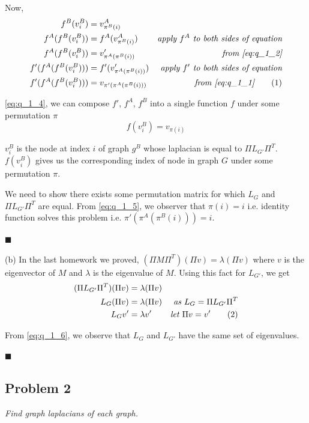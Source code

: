 \documentclass[12pt,a4paper]{article}
\newcommand\numberthis{\addtocounter{equation}{1}\tag{\theequation}}
\newcommand{\rightqed}{
\begin{flushright}
$\blacksquare$
\end{flushright}
}
\begin{document}
Now,
\begin{align*}
    f^B(v_i^B) &= v_{\pi^B(i)}^A &\\
    f^A(f^B(v_i^B)) &= f^A(v_{\pi^B(i)}^A) &\textit{apply $f^A$ to both sides of equation}\\
    f^A(f^B(v_i^B)) &= v'_{\pi^A(\pi^B(i))} &\textit{from \eqref{eq:q_1_2}} \\
    f'(f^A(f^B(v_i^B))) &= f'(v'_{\pi^A(\pi^B(i))}) &\textit{apply $f'$ to both sides of equation}\\
    f'(f^A(f^B(v_i^B))) &= v_{\pi'(\pi^A(\pi^B(i)))} &\textit{from \eqref{eq:q_1_1}} \numberthis \label{eq:q_1_4}
\end{align*}

\eqref{eq:q_1_4}, we can compose $f'$, $f^A$, $f^B$ into a single function $f$ under some permutation $\pi$
\begin{equation}
    f(v_i^B) = v_{\pi(i)} \label{eq:q_1_5}
\end{equation}

$v_i^B$ is the node at index $i$ of graph $g^B$ whose laplacian is equal to $\Pi L_{G'}\Pi^T$. $f(v_i^B)$ gives us the corresponding index of node in graph $G$ under some permutation $\pi$.

We need to show there exists some permutation matrix for which $L_G$ and $\Pi L_{G'}\Pi^T$ are equal. From \eqref{eq:q_1_5}, we observer that $\pi(i) = i$ i.e. identity function solves this problem i.e. $\pi'(\pi^A(\pi^B(i))) = i$.
\rightqed

(b) In the last homework we proved, $(\Pi M\Pi^T)(\Pi v) = \lambda(\Pi v)$ where $v$ is the eigenvector of $M$ and $\lambda$ is the eigenvalue of $M$. Using this fact for $L_{G'}$, we get
\begin{align*}
    (\Pi L_{G'}\Pi^T)(\Pi v) &= \lambda(\Pi v) &\\
    L_G(\Pi v) &= \lambda(\Pi v) &\textit{as $L_G = \Pi L_{G'}\Pi^T$} \\
    L_Gv' &= \lambda v' &\textit{let $\Pi v = v'$} \numberthis \label{eq:q_1_6}
\end{align*}

From \eqref{eq:q_1_6}, we observe that $L_G$ and $L_{G'}$ have the same set of eigenvalues.
\rightqed

\newpage
\subsection*{Problem 2}
\textit{
    Find graph laplacians of each graph.
}
\end{document}
